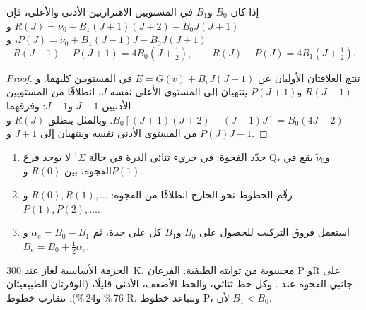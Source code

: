 \begin{theorem}\label{thm:b3:rovibrational-spectroscopy:combination-differences}
إذا كان  $B_0$ و$B_1$ في المستويين الاهتزازيين الأدنى والأعلى،
فإن $R(J) = \tilde\nu_0 + B_1(J+1)(J+2) - B_0J(J+1)$ و$P(J) = \tilde\nu_0 +
B_1(J-1)J - B_0J(J+1)$، و
\[
R(J - 1) - P(J + 1) = 4B_0(J + \tfrac12), \qquad R(J) - P(J) = 4B_1(J + \tfrac12).
\]
\end{theorem}

\begin{proof}
تنتج العلاقتان الأوليان عن $E = G(v) + B_vJ(J+1)$ في المستويين كليهما. و$R(J - 1)$ 
و$P(J + 1)$ ينتهيان إلى المستوى الأعلى نفسه $J$، انطلاقًا من المستويين الأدنيين $J - 1$ و$J + 1$:
وفرقهما $B_0[(J+1)(J+2) - (J-1)J] = B_0(4J + 2)$. وبالمثل ينطلق $R(J)$ 
و$P(J)$ من المستوى الأدنى نفسه وينتهيان إلى $J + 1$ و$J - 1$.
\end{proof}

\begin{method}\label{met:b3:rovibrational-spectroscopy:combination}
\begin{enumerate}
  \item حدّد الفجوة: في جزيء ثنائي الذرة في حالة ${}^1\Sigma$ لا يوجد فرع Q، 
        و$\tilde\nu_0$ يقع في الفجوة، بين $R(0)$ و$P(1)$.
  \item رقّم الخطوط نحو الخارج انطلاقًا من الفجوة: $R(0), R(1), \dots$ و$P(1),
        P(2), \dots$.
  \item استعمل فروق التركيب للحصول على $B_0$ و$B_1$
        كل على حدة، ثم $\alpha_e = B_0 - B_1$ و$B_e = B_0 + \frac12\alpha_e$.
\end{enumerate}
\end{method}

\begin{omfigure}

{\small الحزمة الأساسية لغاز  عند \qty{300}{K}، محسوبة من
ثوابته الطيفية: الفرعان P وR على جانبي الفجوة عند
. وكل خط ثنائي،  والخط الأضعف، الأدنى
قليلًا،  (الوفرتان الطبيعيتان 76\,\% و24\,\%). تتقارب خطوط R،
وتتباعد خطوط P، لأن $B_1 < B_0$.}
\end{omfigure}

